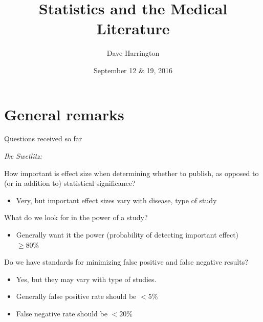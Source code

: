 \documentclass[ignorenonframetext,]{beamer}
\title{Statistics and the Medical Literature}
\author{Dave Harrington}
\date{September 12 \& 19, 2016}
\begin{document}
\frame{\titlepage}

\begin{frame}
\tableofcontents[hideallsubsections]
\end{frame}

\section{General remarks}\label{general-remarks}

\begin{frame}{Questions received so far}

\textit{Ike Swetlitz:}

How important is effect size when determining whether to publish, as
opposed to (or in addition to) statistical significance?

\begin{itemize}
\itemsep1pt\parskip0pt
\item
  Very, but important effect sizes vary with disease, type of study
\end{itemize}

What do we look for in the power of a study?

\begin{itemize}
\itemsep1pt\parskip0pt
\item
  Generally want it the power (probability of detecting important
  effect) \(\ge 80\%\)
\end{itemize}

Do we have standards for minimizing false positive and false negative
results?

\begin{itemize}
\item
  Yes, but they may vary with type of studies.
\item
  Generally false positive rate should be \(<5\%\)
\item
  False negative rate should be \(<20\%\)
\end{itemize}

\end{frame}
\end{document}
